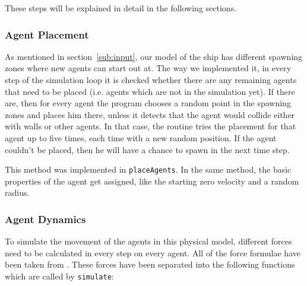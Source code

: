\documentclass[11pt]{article}
\begin{document}
These steps will be explained in detail in the following sections.

\subsubsection{Agent Placement}

As mentioned in section~\ref{sub:input}, our model of the ship has different
spawning zones where new agents can start out at.  The way we implemented it,
in every step of the simulation loop it is checked whether there are any
remaining agents that need to be placed (i.e. agents which are not in the
simulation yet).  If there are, then for every agent the program chooses a
random point in the spawning zones and places him there, unless it detects that
the agent would collide either with walls or other agents.  In that case, the
routine tries the placement for that agent up to five times, each time with a
new random position.  If the agent couldn't be placed, then he will have a
chance to spawn in the next time step.

This method was implemented in \texttt{placeAgents}.  In the same method, the
basic properties of the agent get assigned, like the starting zero velocity and
a random radius.

\subsubsection{Agent Dynamics}
\label{sub:movement}

To simulate the movement of the agents in this physical model, different forces
need to be calculated in every step on every agent.  All of the force formulae
have been taken from \cite{helbing}.  These forces have been separated into the
following functions which are called by \texttt{simulate}:
\end{document}

